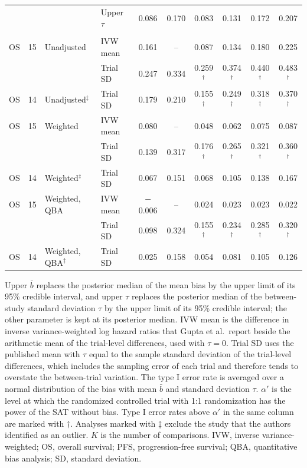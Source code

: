 \begin{table}[!htb]
\begin{tabular}{lcllcccccc}
 &  &  & Upper $\tau$ & 0.086 & 0.170 & 0.083 & 0.131 & 0.172 & 0.207 \\
\addlinespace
\multicolumn{10}{l}{Gupta et al.~\cite{Gupta2025}} \\
OS & 15 & Unadjusted & IVW mean & 0.161 & -- & 0.087 & 0.134 & 0.180 & 0.225 \\
 &  &  & Trial SD & 0.247 & 0.334 & 0.259$^{\dagger}$ & 0.374$^{\dagger}$ & 0.440$^{\dagger}$ & 0.483$^{\dagger}$ \\
OS & 14 & Unadjusted$^{\ddagger}$ & Trial SD & 0.179 & 0.210 & 0.155$^{\dagger}$ & 0.249$^{\dagger}$ & 0.318$^{\dagger}$ & 0.370$^{\dagger}$ \\
OS & 15 & Weighted & IVW mean & 0.080 & -- & 0.048 & 0.062 & 0.075 & 0.087 \\
 &  &  & Trial SD & 0.139 & 0.317 & 0.176$^{\dagger}$ & 0.265$^{\dagger}$ & 0.321$^{\dagger}$ & 0.360$^{\dagger}$ \\
OS & 14 & Weighted$^{\ddagger}$ & Trial SD & 0.067 & 0.151 & 0.068 & 0.105 & 0.138 & 0.167 \\
OS & 15 & Weighted, QBA & IVW mean & $-$0.006 & -- & 0.024 & 0.023 & 0.023 & 0.022 \\
 &  &  & Trial SD & 0.098 & 0.324 & 0.155$^{\dagger}$ & 0.234$^{\dagger}$ & 0.285$^{\dagger}$ & 0.320$^{\dagger}$ \\
OS & 14 & Weighted, QBA$^{\ddagger}$ & Trial SD & 0.025 & 0.158 & 0.054 & 0.081 & 0.105 & 0.126 \\
\bottomrule
\end{tabular}
\par\smallskip
\begin{minipage}{0.95\linewidth}
\footnotesize
Upper $\bar{b}$ replaces the posterior median of the mean bias by the upper limit of its 95\% credible interval, and upper $\tau$ replaces the posterior median of the between-study standard deviation $\tau$ by the upper limit of its 95\% credible interval; the other parameter is kept at its posterior median. IVW mean is the difference in inverse variance-weighted log hazard ratios that Gupta et al.\ report beside the arithmetic mean of the trial-level differences, used with $\tau = 0$. Trial SD uses the published mean with $\tau$ equal to the sample standard deviation of the trial-level differences, which includes the sampling error of each trial and therefore tends to overstate the between-trial variation. The type I error rate is averaged over a normal distribution of the bias with mean $\bar{b}$ and standard deviation $\tau$. $\alpha'$ is the level at which the randomized controlled trial with 1:1 randomization has the power of the SAT without bias. Type I error rates above $\alpha'$ in the same column are marked with $\dagger$. Analyses marked with $\ddagger$ exclude the study that the authors identified as an outlier. $K$ is the number of comparisons. IVW, inverse variance-weighted; OS, overall survival; PFS, progression-free survival; QBA, quantitative bias analysis; SD, standard deviation.
\end{minipage}
\end{table}
